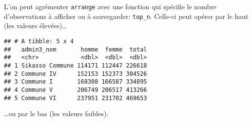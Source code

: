 \documentclass[]{book}
\newenvironment{Shaded}{\begin{snugshade}}{\end{snugshade}}
\newcommand{\KeywordTok}[1]{\textcolor[rgb]{0.13,0.29,0.53}{\textbf{#1}}}
\newcommand{\DataTypeTok}[1]{\textcolor[rgb]{0.13,0.29,0.53}{#1}}
\newcommand{\DecValTok}[1]{\textcolor[rgb]{0.00,0.00,0.81}{#1}}
\newcommand{\StringTok}[1]{\textcolor[rgb]{0.31,0.60,0.02}{#1}}
\newcommand{\CommentTok}[1]{\textcolor[rgb]{0.56,0.35,0.01}{\textit{#1}}}
\newcommand{\OperatorTok}[1]{\textcolor[rgb]{0.81,0.36,0.00}{\textbf{#1}}}
\newcommand{\NormalTok}[1]{#1}
\begin{document}
L'on peut agrémenter \texttt{arrange} avec une fonction qui spécifie le
nombre d'observations à afficher ou à sauvegarder: \texttt{top\_n}.
Celle-ci peut opérer par le haut (les valeurs élevées)\ldots{}

\begin{Shaded}
\end{Shaded}

\begin{verbatim}
## # A tibble: 5 x 4
##   admin3_nom       homme  femme  total
##   <chr>            <dbl>  <dbl>  <dbl>
## 1 Sikasso Commune 114171 112447 226618
## 2 Commune IV      152153 152373 304526
## 3 Commune I       168308 166587 334895
## 4 Commune V       206749 206517 413266
## 5 Commune VI      237951 231702 469653
\end{verbatim}

\ldots{}ou par le bas (les valeurs faibles).
\end{document}
